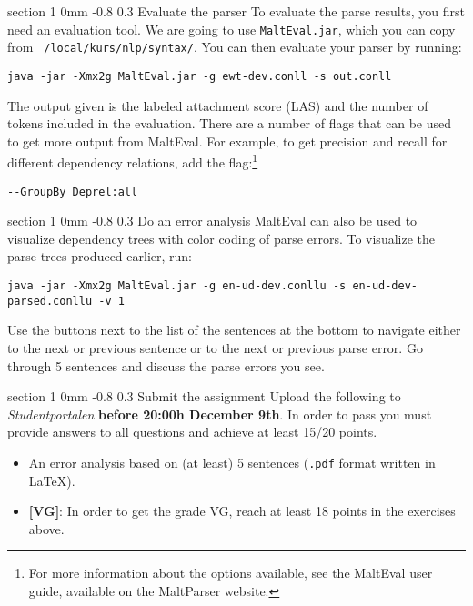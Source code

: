 \documentclass[11pt]{article}
\makeatletter
\newcommand{\newsec}[2]{\section{#1}\label{sec:#2}\noindent}
\renewcommand{\section}{\@startsection
{section}%
{1}%
{0mm}%
{-0.8\baselineskip}%
{0.3\baselineskip}%
{\bfseries\large}}%
\makeatother
\begin{document}
\newsec{Evaluate the parser}{eval}%
To evaluate the parse results, you first need an evaluation tool. We
are going to use {\tt MaltEval.jar}, which you can copy from {\tt
  /local/kurs/nlp/syntax/}. You can then evaluate your parser by
running:
\begin{small}
\begin{verbatim}
java -jar -Xmx2g MaltEval.jar -g ewt-dev.conll -s out.conll
\end{verbatim}
\end{small}
The output given is the labeled attachment score (LAS) and the number
of tokens included in the evaluation. There are a number of flags that
can be used to get more output from MaltEval. For example, to get
precision and recall for different dependency relations, add the
flag:\footnote{For more information about the options available, see
  the MaltEval user guide, available on the MaltParser website.}
\begin{small}
\begin{verbatim}
--GroupBy Deprel:all
\end{verbatim}
\end{small}

\newsec{Do an error analysis}{err}%
MaltEval can also be used to visualize dependency trees with color
coding of parse errors. To visualize the parse trees produced earlier,
run:
\begin{small}
\begin{verbatim}
java -jar -Xmx2g MaltEval.jar -g en-ud-dev.conllu -s en-ud-dev-parsed.conllu -v 1
\end{verbatim}
\end{small}
Use the buttons next to the list of the sentences at the bottom to
navigate either to the next or previous sentence or to the next or
previous parse error.
Go through 5 sentences and discuss the parse errors you see.

\newsec{Submit the assignment}{sub}%
Upload the following to {\it Studentportalen} \textbf{before 20:00h
  December 9th}. In order to pass you must provide answers to all
questions and achieve at least 15/20 points.
\begin{itemize}[noitemsep,topsep=0.2cm]
\item An error analysis based on (at least) 5 sentences (\texttt{.pdf}
  format written in \LaTeX).
\item \textbf{[VG]}: In order to get the grade VG, reach at least 18
  points in the exercises above.
\end{itemize}
\end{document}
